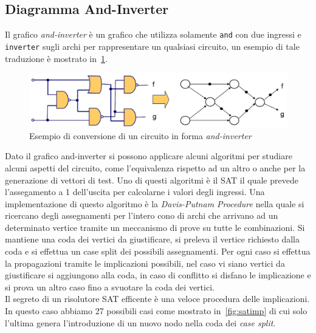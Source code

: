 \subsection{Diagramma And-Inverter}
Il grafico \emph{and-inverter} è un grafico che utilizza solamente \texttt{and} con due ingressi e \texttt{inverter} sugli archi per rappresentare un qualsiasi circuito, un esempio di tale traduzione è mostrato in \figurename\,\ref{fig:andinverter}.\\
\begin{figure}
\centering
\includegraphics[scale=0.5]{img/andinverter.png}
\caption{Esempio di conversione di un circuito in forma \emph{and-inverter}}\label{fig:andinverter}
\end{figure}
Dato il grafico and-inverter si possono applicare alcuni algoritmi per studiare alcuni aspetti del circuito, come l'equivalenza rispetto ad un altro o anche per la generazione di vettori di test. Uno di questi algoritmi è il SAT il quale prevede l'assegamento a 1 dell'uscita per calcolarne i valori degli ingressi. Una implementazione di questo algoritmo è la \emph{Davis-Putnam Procedure} nella quale si ricercano degli assegnamenti per l'intero cono di archi che arrivano ad un determinato vertice tramite un meccanismo di prove su tutte le combinazioni. Si mantiene una coda dei vertici da giustificare, si preleva il vertice richiesto dalla coda e si effettua un case split dei possibili assegnamenti. Per ogni caso si effettua la propagazioni tramite le implicazioni possibili, nel caso vi siano vertici da giustificare si aggiungono alla coda, in caso di conflitto si disfano le implicazione e si prova un altro caso fino a svuotare la coda dei vertici.\\
Il segreto di un risolutore SAT efficente è una veloce procedura delle implicazioni. In questo caso abbiamo 27 possibili casi come mostrato in \figurename\,\ref{fig:satimp} di cui solo l'ultima genera l'introduzione di un nuovo nodo nella coda dei \emph{case split}.
